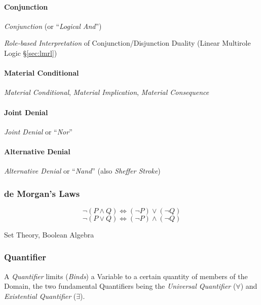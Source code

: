 \paragraph{Conjunction}\label{sec:conjunction}\hfill

\emph{Conjunction} (or ``\emph{Logical And}'')

\fist \emph{Role-based Interpretation} of Conjunction/Disjunction
Duality (Linear Multirole Logic \S\ref{sec:lmrl})



\paragraph{Material Conditional}\label{sec:material_conditional}\hfill

\emph{Material Conditional}, \emph{Material Implication},
\emph{Material Consequence}



\paragraph{Joint Denial}\label{sec:joint_denial}\hfill

\emph{Joint Denial} or ``\emph{Nor}''



\paragraph{Alternative Denial}\label{sec:alternative_denial}\hfill

\emph{Alternative Denial} or ``\emph{Nand}'' (also \emph{Sheffer
  Stroke})



\subsubsection{de Morgan's Laws}\label{sec:de_morgan}

\[
  \neg (P \wedge Q) \Leftrightarrow (\neg P) \vee (\neg Q)
\] \[
  \neg (P \vee Q) \Leftrightarrow (\neg P) \wedge (\neg Q)
\]

Set Theory, Boolean Algebra



\subsubsection{Quantifier}\label{sec:quantifier}

A \emph{Quantifier} limits (\emph{Binds}) a Variable to a certain
quantity of members of the Domain, the two fundamental Quantifiers
being the \emph{Universal Quantifier} ($\forall$) and
\emph{Existential Quantifier} ($\exists$).

